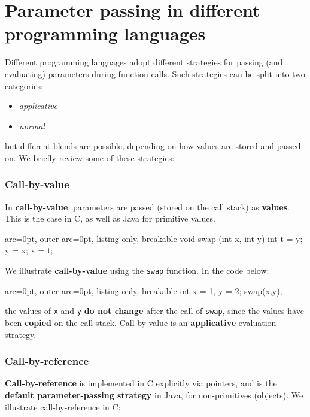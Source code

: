 \section*{ Parameter passing in different programming languages }

Different programming languages adopt different strategies for passing (and evaluating) parameters during function calls. Such strategies can be split into two categories:
\begin{itemize}
	\item  \textit{applicative}
	\item  \textit{normal}
\end{itemize}

but different blends are possible, depending on how values are stored and passed on. We briefly review some of these strategies:

\subsubsection*{ Call-by-value }

In \textbf{call-by-value}, parameters are passed (stored on the call stack) as \textbf{values}. This is the case in C, as well as Java for primitive values.


\begin{tcblisting}{ arc=0pt, outer arc=0pt, listing only, breakable}
void swap (int x, int y){
        int t = y;
        y = x;
        x = t;
}

\end{tcblisting}


We illustrate \textbf{call-by-value} using the \texttt{swap} function. In the code below:

\begin{tcblisting}{ arc=0pt, outer arc=0pt, listing only, breakable}
int x = 1, y = 2;
swap(x,y);

\end{tcblisting}

the values of \texttt{x} and \texttt{y} \textbf{do not change} after the call of \texttt{swap}, since the values have been \textbf{copied} on the call stack. Call-by-value is an \textbf{applicative} evaluation strategy.

\subsubsection*{ Call-by-reference }

\textbf{Call-by-reference} is implemented in C explicitly via pointers, and is the \textbf{default parameter-passing strategy} in Java, for non-primitives (objects). We illustrate call-by-reference in C:

